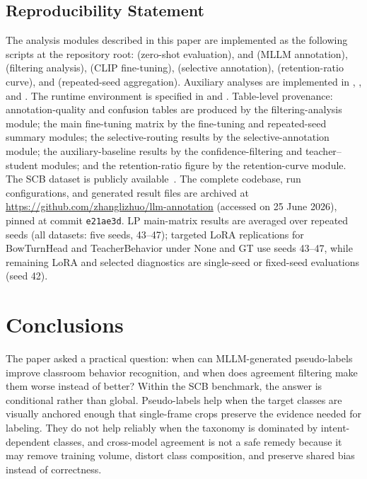 \documentclass{ieeeaccess}
\begin{document}
\subsection{Reproducibility Statement}
\label{sec:repro}

The analysis modules described in this paper are implemented as the
following scripts at the repository root:
 (zero-shot evaluation),
 and 
(MLLM annotation),
 (filtering analysis),
 (CLIP fine-tuning),
 (selective annotation),
 (retention-ratio curve),
and  (repeated-seed aggregation).
Auxiliary analyses are implemented in
,
,
and .
The runtime environment is specified in 
and .
Table-level provenance: annotation-quality and confusion tables are
produced by the filtering-analysis module; the main fine-tuning matrix
by the fine-tuning and repeated-seed summary modules; the
selective-routing results by the selective-annotation module; the
auxiliary-baseline results by the confidence-filtering and
teacher--student modules; and the retention-ratio figure by the
retention-curve module.
The SCB dataset is publicly available~\cite{scb_dataset}.
The complete codebase, run configurations, and generated result files
are archived at
\url{https://github.com/zhanglizhuo/llm-annotation}
(accessed on 25 June 2026), pinned at commit \texttt{e21ae3d}.
LP main-matrix results are averaged over repeated seeds
(all datasets: five seeds, 43--47); targeted LoRA replications
for BowTurnHead and TeacherBehavior under None and GT use
seeds 43--47, while remaining LoRA and selected diagnostics
are single-seed or fixed-seed evaluations (seed 42).

\section{Conclusions}
\label{sec:conclusions}

The paper asked a practical question: when can MLLM-generated
pseudo-labels improve classroom behavior recognition, and when does
agreement filtering make them worse instead of better?
Within the SCB benchmark, the answer is conditional rather
than global.
Pseudo-labels help when the target classes are visually anchored
enough that single-frame crops preserve the evidence needed for
labeling.
They do not help reliably when the taxonomy is dominated by
intent-dependent classes, and cross-model agreement is not a safe
remedy because it may remove training volume, distort class
composition, and preserve shared bias instead of correctness.
\end{document}
